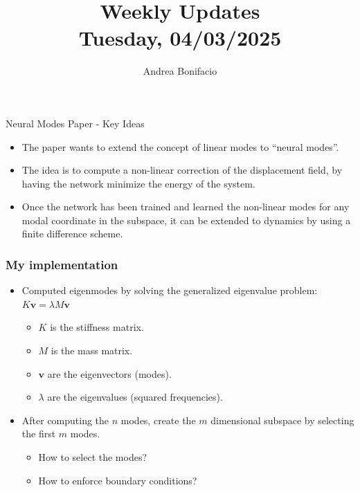 \documentclass{beamer}
\title{Weekly Updates\\
\tiny{Tuesday, 04/03/2025}}
\author{Andrea Bonifacio}
\date{}
\begin{document}
\begin{frame}
\titlepage
\end{frame}


\begin{frame}{Neural Modes Paper - Key Ideas}
    \begin{itemize}
        \item The paper wants to extend the concept of linear modes to ``neural modes''.
        \item The idea is to compute a non-linear correction of the displacement field, by having the network minimize the energy of the system.
        \item Once the network has been trained and learned the non-linear modes for any modal coordinate in the subspace, it can be extended to dynamics by using a finite difference scheme.
    \end{itemize}
\end{frame}



\begin{frame}
\frametitle{My implementation}
\begin{itemize}
    \item Computed eigenmodes by solving the generalized eigenvalue problem: \( K \mathbf{v} = \lambda M \mathbf{v} \)
    \begin{itemize}
        \item \( K \) is the stiffness matrix.
        \item \( M \) is the mass matrix.
        \item \( \mathbf{v} \) are the eigenvectors (modes).
        \item \( \lambda \) are the eigenvalues (squared frequencies).
    \end{itemize}
    \item After computing the \(n\) modes, create the \(m\) dimensional subspace by selecting the first \(m\) modes.
    \begin{itemize}
        \item How to select the modes?
        \item How to enforce boundary conditions?
    \end{itemize}
\end{itemize}
\end{frame}
\end{document}
